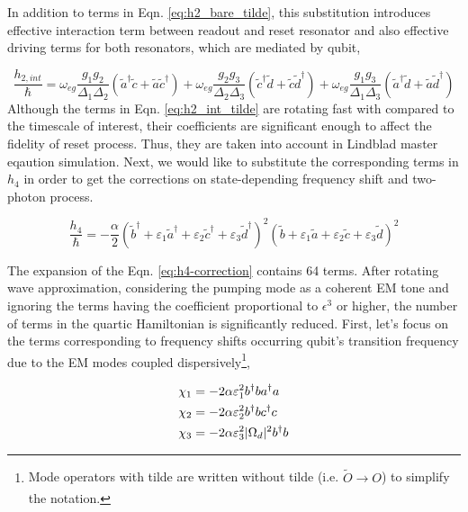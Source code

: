 In addition to terms in Eqn. \ref{eq:h2_bare_tilde}, this substitution introduces effective interaction term between readout and reset resonator and also effective driving terms for both resonators, which are mediated by qubit,

\begin{equation} \label{eq:h2_int_tilde}
    \frac{h_{2,int}}{\hbar} = \omega_{eg} \frac{g_1 g_2}{\Delta_1 \Delta_2}(\tilde{a}^\dagger \tilde{c} + \tilde{a} \tilde{c}^\dagger) + \omega_{eg} \frac{g_2 g_3}{\Delta_2 \Delta_3}(\tilde{c}^\dagger \tilde{d} + \tilde{c} \tilde{d}^\dagger) +\omega_{eg} \frac{g_1 g_3}{\Delta_1 \Delta_3}(\tilde{a}^\dagger \tilde{d} + \tilde{a} \tilde{d}^\dagger)
\end{equation}
Although the terms in Eqn. \ref{eq:h2_int_tilde} are rotating fast with compared to the timescale of interest, their coefficients are significant enough to affect the fidelity of reset process. Thus, they are taken into account in Lindblad master eqaution simulation. Next, we would like to substitute the corresponding terms in $h_4$ in order to get the corrections on state-depending frequency shift and two-photon process.

\begin{equation} \label{eq:h4-correction}
    \frac{h_4}{\hbar} = -\frac{\alpha}{2} (\tilde{b}^\dagger + \varepsilon_1 \tilde{a}^\dagger + \varepsilon_2 \tilde{c}^\dagger + \varepsilon_3 \tilde{d}^\dagger)^2 (\tilde{b} + \varepsilon_1 \tilde{a} + \varepsilon_2 \tilde{c} + \varepsilon_3 \tilde{d})^2
\end{equation}

The expansion of the Eqn. \ref{eq:h4-correction} contains 64 terms. After rotating wave approximation, considering the pumping mode as a coherent EM tone and ignoring the terms having the coefficient proportional to $\epsilon^3$ or higher, the number of terms in the quartic Hamiltonian is significantly reduced. First, let's focus on the terms corresponding to frequency shifts occurring qubit's transition frequency due to the EM modes coupled dispersively\footnote{Mode operators with tilde are written without tilde (i.e. $\tilde{O} \xrightarrow[]{} O$) to simplify the notation.},

\begin{equation} \begin{split}
	\chi_1 &= -2\alpha \varepsilon_1^2 b^\dagger b a^\dagger a \\
	\chi_2 &= -2\alpha \varepsilon_2^2 b^\dagger b c^\dagger c \\
	\chi_3 &= -2\alpha \varepsilon_3^2 \lvert \Omega_d \rvert^2 b^\dagger b 
\end{split} \end{equation}


